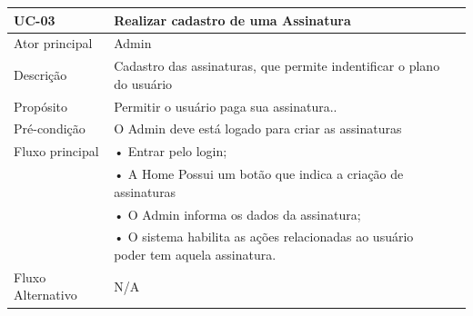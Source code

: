 \documentclass[a4paper,12pt]{article}
\begin{document}
\begin{table}[ht]
    \centering
    \begin{tabular}{|p{3.5cm}|p{10cm}|p{7cm}|}
        \hline
        \textbf{UC-03}                     & \textbf{Realizar cadastro de uma Assinatura}                                                                     \\
        \hline

        \multirow{1}{*}{Ator principal}    & Admin                                                                                                            \\
        \hline
        \multirow{1}{*}{Descrição}         & Cadastro das assinaturas, que permite indentificar o plano do usuário                                            \\
        \hline

        \multirow{1}{*}{Propósito}         & Permitir o usuário paga sua assinatura..                                                                         \\
        \hline

        \multirow{1}{*}{Pré-condição}      & O Admin deve está logado para criar as assinaturas                                                               \\
        \hline

        \multirow{1}{*}{Fluxo principal}
                                           & • Entrar pelo login;                                                                                             \\
                                           & • A Home Possui um botão que indica a criação de assinaturas                                                     \\
                                           & • O Admin informa os dados da assinatura;                                                                        \\
                                           & • O sistema habilita as ações relacionadas ao usuário poder tem aquela assinatura.                               \\
        \cline{2-2}
        \hline

        \multirow{1}{*}{Fluxo Alternativo} & N/A                                                                                                              \\
        \hline


\end{tabular}
\end{table}
\end{document}
